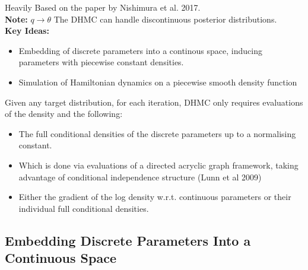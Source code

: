 \documentclass[]{report}
\begin{document}
Heavily Based on the paper by Nishimura et al. 2017. \\
\textbf{Note: } $q \rightarrow \theta$
The DHMC can handle discontinuous posterior distributions. 
\\
\textbf{Key Ideas:}
\begin{itemize}
	\item Embedding of discrete parameters into a continous space, inducing parameters with piecewise constant densities. 
	\item Simulation of Hamiltonian dynamics on a piecewise smooth density function
\end{itemize} 
Given any target distribution, for each iteration, DHMC only requires evaluations of the density and the following:
\begin{itemize}
	\item The full conditional densities of the discrete parameters up to a normalising constant. 
	\item Which is done via evaluations of a directed acryclic graph framework, taking advantage of conditional independence structure (Lunn et al 2009)
	\item Either the gradient of the log density w.r.t. continuous parameters or their individual full conditional densities. 
\end{itemize}

\subsection{Embedding Discrete Parameters Into a Continuous Space}
\end{document}
